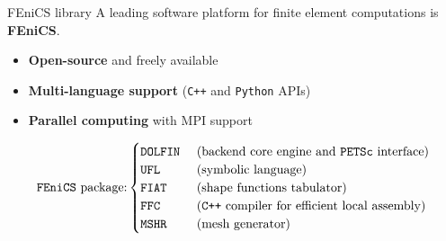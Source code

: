 \begin{frame}{FEniCS library}
   \small{A leading software platform for finite element computations is \textbf{\textcolor{BrickRed}{FEniCS}}.}

   \vfill

   \pause

   \scriptsize

   \begin{minipage}{0.38\textwidth}
      \begin{itemize}
         \item \textbf{Open-source} and freely available
         \item \textbf{Multi-language support} (\texttt{C++} and \texttt{Python} APIs)
         \item \textbf{Parallel computing} with MPI support
      \end{itemize}
   \end{minipage}
   \hfill

   \vfill

   \pause

   \small

   \begin{equation*}
      \text{\texttt{FEniCS} package:}
      \begin{cases}
         \text{\texttt{DOLFIN}} \ &\text{(backend core engine and \texttt{PETSc} interface)}\\
         \text{\texttt{UFL}} \ &\text{(symbolic language)}\\
         \text{\texttt{FIAT}} \ &\text{(shape functions tabulator)}\\
         \text{\texttt{FFC}} \ &\text{(\texttt{C++} compiler for efficient local assembly)}\\
         \text{\texttt{MSHR}} \ &\text{(mesh generator)}
      \end{cases}
   \end{equation*}

   \normalsize
\end{frame}

